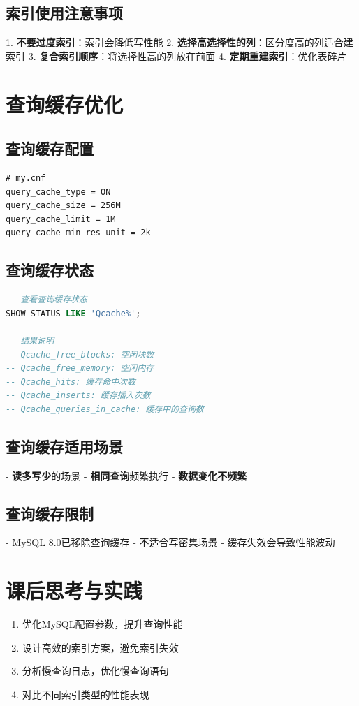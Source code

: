 \documentclass[12pt,UTF8]{ctexbook}
\begin{document}
\subsection*{索引使用注意事项}

1. \textbf{不要过度索引}：索引会降低写性能
2. \textbf{选择高选择性的列}：区分度高的列适合建索引
3. \textbf{复合索引顺序}：将选择性高的列放在前面
4. \textbf{定期重建索引}：优化表碎片

\section{查询缓存优化}
\label{sec:query-cache}

\subsection*{查询缓存配置}

\begin{lstlisting}
# my.cnf
query_cache_type = ON
query_cache_size = 256M
query_cache_limit = 1M
query_cache_min_res_unit = 2k
\end{lstlisting}

\subsection*{查询缓存状态}

\begin{lstlisting}[language=sql]
-- 查看查询缓存状态
SHOW STATUS LIKE 'Qcache%';

-- 结果说明
-- Qcache_free_blocks: 空闲块数
-- Qcache_free_memory: 空闲内存
-- Qcache_hits: 缓存命中次数
-- Qcache_inserts: 缓存插入次数
-- Qcache_queries_in_cache: 缓存中的查询数
\end{lstlisting}

\subsection*{查询缓存适用场景}

- \textbf{读多写少}的场景
- \textbf{相同查询}频繁执行
- \textbf{数据变化不频繁}

\subsection*{查询缓存限制}

- MySQL 8.0已移除查询缓存
- 不适合写密集场景
- 缓存失效会导致性能波动

\section{课后思考与实践}
\label{sec:db-tuning-optimization-practice}
\begin{enumerate}
    \item 优化MySQL配置参数，提升查询性能
    \item 设计高效的索引方案，避免索引失效
    \item 分析慢查询日志，优化慢查询语句
    \item 对比不同索引类型的性能表现
\end{enumerate}
\end{document}
